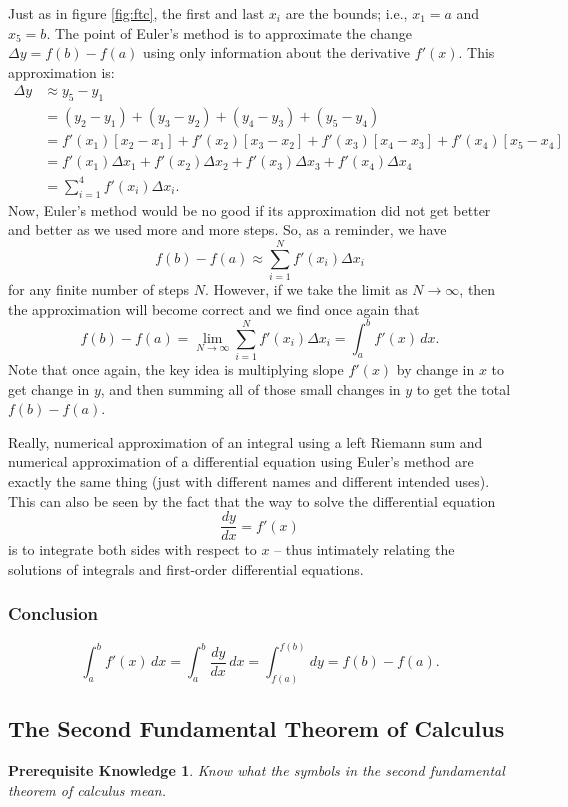 \documentclass{myarticle}
\theoremstyle{nospace}
\newtheorem*{oldprereq}{Prerequisite Knowledge}
\newenvironment{prereq}{\begin{mdframed}\begin{oldprereq}}{\end{oldprereq}\end{mdframed}}
\newtheorem{old series theorem}{Theorem}
\newenvironment{series theorem}{\begin{mdframed}\begin{old series theorem}}{\end{old series theorem}\end{mdframed}}
\begin{document}
Just as in figure \ref{fig:ftc}, the first and last $x_i$ are the bounds; i.e., $x_1 = a$ and $x_5 = b$. The point of Euler's method is to approximate the change $\Delta y = f(b) - f(a)$ using only information about the derivative $f'(x)$. This approximation is: \begin{align*} \Delta y &\approx y_5 - y_1 \\ &= (y_2 - y_1) + (y_3 - y_2) + (y_4 - y_3) + (y_5 - y_4) \\ &= f'(x_1)[x_2 - x_1] + f'(x_2)[x_3 - x_2] + f'(x_3)[x_4 - x_3] + f'(x_4)[x_5 - x_4] \\ &= f'(x_1)\Delta x_1 + f'(x_2)\Delta x_2 + f'(x_3)\Delta x_3 + f'(x_4)\Delta x_4 \\ &= \sum_{i=1}^4 f'(x_i)\Delta x_i. \end{align*} Now, Euler's method would be no good if its approximation did not get better and better as we used more and more steps. So, as a reminder, we have \[ f(b) - f(a) \approx \sum_{i=1}^N f'(x_i)\Delta x_i \] for any finite number of steps $N$. However, if we take the limit as $N \to \infty$, then the approximation will become correct and we find once again that \[ f(b) - f(a) = \lim_{N \to \infty} \sum_{i=1}^N f'(x_i)\Delta x_i = \int_a^b f'(x) \,dx. \] Note that once again, the key idea is multiplying slope $f'(x)$ by change in $x$ to get change in $y$, and then summing all of those small changes in $y$ to get the total $f(b) - f(a)$.

Really, numerical approximation of an integral using a left Riemann sum and numerical approximation of a differential equation using Euler's method are exactly the same thing (just with different names and different intended uses). This can also be seen by the fact that the way to solve the differential equation \[ \frac{dy}{dx} = f'(x) \] is to integrate both sides with respect to $x$ -- thus intimately relating the solutions of integrals and first-order differential equations.

\subsubsection{Conclusion} \label{sec:ftc conclusion}

\[ \int_a^b f'(x) \,dx = \int_a^b \frac{dy}{dx} \,dx = \int_{f(a)}^{f(b)} dy = f(b) - f(a). \]

\subsection{The Second Fundamental Theorem of Calculus} \label{sec:ftc2}
\begin{prereq} Know what the symbols in the second fundamental theorem of calculus mean. \end{prereq}
\end{document}
